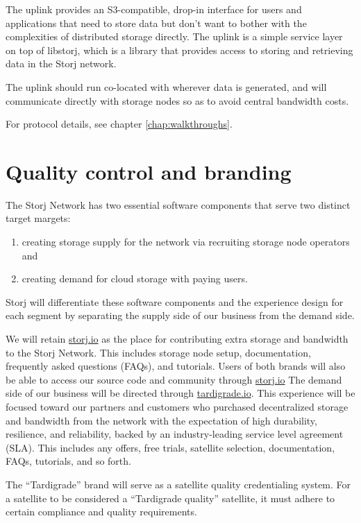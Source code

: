 \documentclass[11pt,fleqn,openany]{book}
\begin{document}
The uplink provides an S3-compatible, drop-in interface for users and
applications that
need to store data but don't want to bother with the complexities of distributed
storage directly. The uplink is a simple service layer on top of libstorj,
which is a library that provides access to storing and retrieving data in the
Storj network.

The uplink should run co-located with wherever data is generated, and will
communicate directly with storage nodes so as to avoid central bandwidth costs.

For protocol details, see chapter \ref{chap:walkthroughs}.

\section{Quality control and branding}\label{sec:qc}

The Storj Network has two essential software components that serve two distinct
target margets:

\begin{enumerate}
\item creating storage supply for the network via recruiting storage node
  operators and
\item creating demand for cloud storage with paying users.
\end{enumerate}

Storj will differentiate these software components and the experience design
for each segment by separating the supply side of our business from the
demand side.

We will retain \url{storj.io} as the place for contributing extra storage and
bandwidth to the Storj Network. This includes storage node setup, documentation,
frequently asked questions (FAQs), and tutorials. Users of both brands will also be able to 
access our source code and community through \url{storj.io}
The demand side of our business will be directed through \url{tardigrade.io}.
This experience will be focused toward our partners and customers who purchased
decentralized storage and bandwidth from the network with the expectation of
high durability, resilience, and reliability, backed by an industry-leading
service level agreement (SLA). This includes any offers, free trials, satellite
selection, documentation, FAQs, tutorials, and so forth.

The ``Tardigrade'' brand will serve as a satellite quality credentialing system.
For a satellite to be considered a ``Tardigrade quality'' satellite, it must
adhere to certain compliance and quality requirements.
\end{document}

